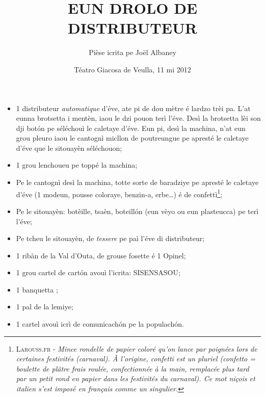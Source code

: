 \title{EUN DROLO DE DISTRIBUTEUR}
\author{Pièse icrita pe Joël Albaney}
\date{Téatro Giacosa de Veulla, 11 mi 2012}

\maketitle





\Scenographie
\begin{itemize}
\item[$\bullet$] 1 distributeur \textit{automatique} d'éve, ate pi de dou mètre é lardzo trèi pa. L'at eunna brotsetta i mentèn, iaou le dzi pouon terì l'éve. Desì la brotsetta lèi son dji bot\'on pe séléchouì le caletaye d'éve. Eun pi, desì la machina, n'at eun grou pleuro iaou le cantognì mi\-cllon de poutreungue pe apresté le caletaye d'éve que le sitouayèn séléchouon;
\item[$\bullet$] 1 grou lenchoueu pe toppé la machina;
\item[$\bullet$] Pe le cantognì desì la machina, totte sorte de baradziye pe apresté le caletaye d'éve (1 modeun, pousse coloraye, benzin-a, erbe\ldots ) é de confettì\footnote{ \textsc{Larouss.fr} - \textit{Mince rondelle de papier coloré qu'on lance par poignées lors de certaines festivités (carnaval). À l'origine, confetti est un pluriel (confetto = boulette de plâtre frais roulée, confectionnée à la main, remplacée plus tard par un petit rond en papier dans les festivités du carnaval). Ce mot niçois et italien s'est imposé en français comme un singulier.}};
\item[$\bullet$] Pe le sitouayèn: botèille, tsaèn, boteill\'on (eun vèyo ou eun plasteucca) pe terì l'éve;
\item[$\bullet$] Pe tcheu le sitouayèn, de \textit{tessere} pe paì l'éve di distributeur;
\item[$\bullet$] 1 ribàn de la Val d'Outa, de grouse fosette é 1 Opinel;
\item[$\bullet$] 1 grou cartel de cart\'on avouì l'icrita: \og SISENSASOU\fg;
\item[$\bullet$] 1 banquetta \panchina ;
\item[$\bullet$] 1 pal de la lemiye;
\item[$\bullet$] 1 cartel avouì icrì de comunicach\'on pe la populach\'on.
\end{itemize}

